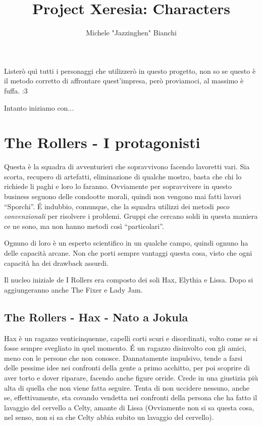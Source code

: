 \documentclass[9pt,a4paper,cleardoubleempty]{scrbook}
\author{Michele "Jazzinghen" Bianchi}
\title{Project Xeresia: Characters}
\begin{document}
    
    Listerò quì tutti i personaggi che utilizzerò in questo progetto,
    non so se questo è il metodo corretto di affrontare quest'impresa, però
    proviamoci, al massimo è fuffa. :3

    Intanto iniziamo con...

    \chapter{The Rollers - I protagonisti}

    Questa è la squadra di avventurieri che sopravvivono facendo lavoretti
    vari. Sia scorta, recupero di artefatti, eliminazione di qualche
    mostro, basta che chi lo richiede li paghi e loro lo faranno.
    Ovviamente per sopravvivere in questo business seguono delle condootte
    morali, quindi non vengono mai fatti lavori ``Sporchi''. \'E indubbio,
    comunque, che la squadra utilizzi dei metodi \emph{poco convenzionali}
    per risolvere i problemi. Gruppi che cercano soldi in questa maniera ce
    ne sono, ma non hanno metodi così ``particolari''.

    Ognuno di loro è un esperto scientifico in un qualche campo, quindi
    ognuno ha delle capacità arcane. Non che porti sempre vantaggi questa
    cosa, visto che ogni capacità ha dei drawback assurdi.

    Il nucleo iniziale de I Rollers era composto dei soli Hax, Elythia e
    Lissa. Dopo si aggiungeranno anche The Fixer e Lady Jam.

    \section{The Rollers - Hax - Nato a Jokula}
        Hax è un ragazzo venticinquenne, capelli corti scuri e disordinati,
        volto come se si fosse sempre svegliato in quel momento.
        \'E un ragazzo disinvolto con gli amici, meno con le persone che
        non conosce. Dannatamente impulsivo, tende a farsi delle pessime
        idee nei confronti della gente a primo acchitto, per poi scoprire
        di aver torto e dover riparare, facendo anche figure orride. Crede
        in una giustizia più alta di quella che non
        viene fatta seguire. Tenta di non uccidere nessuno, anche se,
        effettivamente, sta covando vendetta nei confronti della persona
        che ha fatto il lavaggio del cervello a Celty, amante di Lissa
        (Ovviamente non si sa questa cosa, nel senso, non si sa che Celty
        abbia subito un lavaggio del cervello).
\end{document}
